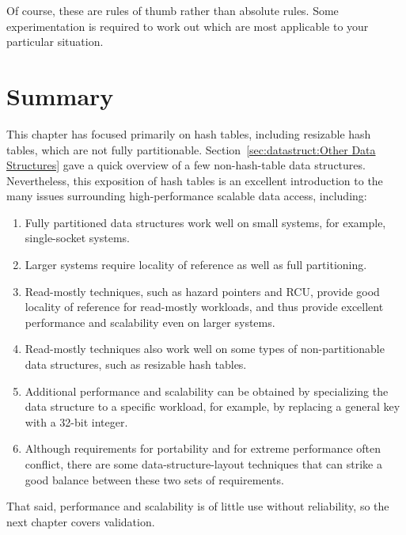 Of course, these are rules of thumb rather than absolute rules.
Some experimentation is required to work out which are most applicable
to your particular situation.

\section{Summary}
\label{sec:datastruct:Summary}

This chapter has focused primarily on hash tables, including resizable
hash tables, which are not fully partitionable.
Section~\ref{sec:datastruct:Other Data Structures} gave a quick
overview of a few non-hash-table data structures.
Nevertheless, this exposition of hash tables is an excellent introduction
to the many issues surrounding high-performance scalable data access,
including:

\begin{enumerate}
\item	Fully partitioned data structures work well on small systems,
	for example, single-socket systems.
\item	Larger systems require locality of reference as well as
	full partitioning.
\item	Read-mostly techniques, such as hazard pointers and RCU,
	provide good locality of reference for read-mostly workloads,
	and thus provide excellent performance and scalability even
	on larger systems.
\item	Read-mostly techniques also work well on some types of
	non-partitionable data structures, such as resizable hash tables.
\item	Additional performance and scalability can be obtained by
	specializing the data structure to a specific workload,
	for example, by replacing a general key with a 32-bit integer.
\item	Although requirements for portability and for extreme performance
	often conflict, there are some data-structure-layout techniques
	that can strike a good balance between these two sets of
	requirements.
\end{enumerate}

That said, performance and scalability is of little use without reliability,
so the next chapter covers validation.
